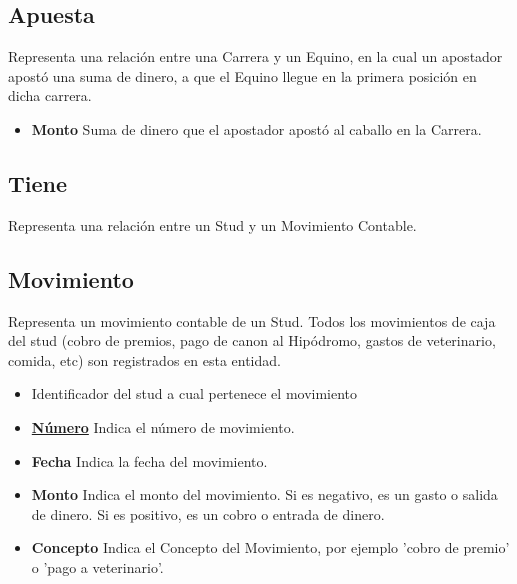 \documentclass[a4paper,11pt]{article}
\begin{document}
\subsection{Apuesta}

Representa una relación entre una Carrera y un Equino, en la cual un apostador
apostó una suma de dinero, a que el Equino llegue en la primera posición en 
dicha carrera. 

\begin{itemize}

  \item \textbf{Monto} Suma de dinero que el apostador apostó al caballo en la
    Carrera.

\end{itemize}

\subsection{Tiene}

Representa una relación entre un Stud y un Movimiento Contable.

\subsection{Movimiento}

Representa un movimiento contable de un Stud. Todos los movimientos de caja
del stud (cobro de premios, pago de canon al Hipódromo, gastos de veterinario, 
comida, etc) son registrados en esta entidad.

\begin{itemize}

  \item \textbf{\uline{}} Identificador del stud a cual pertenece el movimiento

  \item \textbf{\uline{Número}} Indica el número de movimiento.

  \item \textbf{Fecha} Indica la fecha del movimiento.

  \item \textbf{Monto} Indica el monto del movimiento. Si es negativo, es un 
  gasto o salida de dinero. Si es positivo, es un cobro o entrada de dinero.

  \item \textbf{Concepto} Indica el Concepto del Movimiento, por ejemplo 
  'cobro de premio' o 'pago a veterinario'.
      
\end{itemize}
\end{document}
